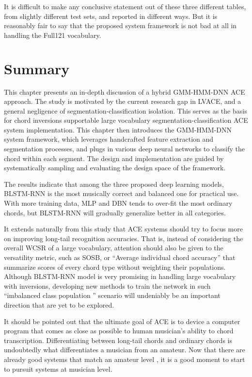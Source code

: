 It is difficult to make any conclusive statement out of these three different tables, from slightly different test sets, and reported in different ways. But it is reasonably fair to say that the proposed system framework is not bad at all in handling the Full121 vocabulary.


\section{Summary} \label{sec:3-concln}
This chapter presents an in-depth discussion of a hybrid GMM-HMM-DNN ACE approach. The study is motivated by the current research gap in LVACE, and a general negligence of segmentation-classification isolation. This serves as the basis for chord inversions supportable large vocabulary segmentation-classification ACE system implementation. This chapter then introduces the GMM-HMM-DNN system framework, which leverages handcrafted feature extraction and segmentation processes, and plugs in various deep neural networks to classify the chord within each segment. The design and implementation are guided by systematically sampling and evaluating the design space of the framework.

The results indicate that among the three proposed deep learning models, BLSTM-RNN is the most musically correct and balanced one for practical use.  With more training data, MLP and DBN tends to over-fit the most ordinary chords, but BLSTM-RNN will gradually generalize better in all categories.

It extends naturally from this study that ACE systems should try to focus more on improving long-tail recognition accuracies. That is, instead of considering the overall WCSR of a large vocabulary, attention should also be given to the versatility metric, such as SOSB, or ``Average individual chord accuracy'' \cite{cho2014improved} that summarize scores of every chord type without weighting their populations. Although BLSTM-RNN model is very promising in handling large vocabulary with inversions, developing new methods to train the network in such ``imbalanced class population '' scenario \cite{chawla2004editorial} will undeniably be an important direction that are yet to be explored.

It should be pointed out that the ultimate goal of ACE is to device a computer program that comes as close as possible to human musician's ability to chord transcription. Differentiating between long-tail chords and ordinary chords is undoubtedly what differentiates a musician from an amateur. Now that there are already good systems that match an amateur level \cite{ni2013understanding}, it is a good moment to start to pursuit systems at musician level.

